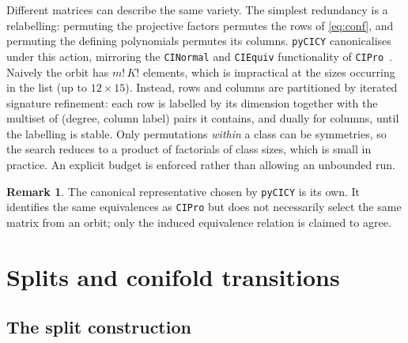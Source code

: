 \documentclass[11pt,a4paper]{article}
\theoremstyle{definition}
\newtheorem{remark}{Remark}
\begin{document}
Different matrices can describe the same variety. The simplest redundancy is
a relabelling: permuting the projective factors permutes the rows of
\cref{eq:conf}, and permuting the defining polynomials permutes its columns.
\texttt{pyCICY} canonicalises under this action, mirroring the
\texttt{CINormal} and \texttt{CIEquiv} functionality of
\texttt{CIPro}~\cite{Anderson2026}. Naively the orbit has $m!\,K!$ elements,
which is impractical at the sizes occurring in the list (up to $12\times 15$).
Instead, rows and columns are partitioned by iterated signature refinement:
each row is labelled by its dimension together with the multiset of
(degree, column label) pairs it contains, and dually for columns, until the
labelling is stable. Only permutations \emph{within} a class can be
symmetries, so the search reduces to a product of factorials of class sizes,
which is small in practice. An explicit budget is enforced rather than
allowing an unbounded run.

\begin{remark}
The canonical representative chosen by \texttt{pyCICY} is its own. It
identifies the same equivalences as \texttt{CIPro} but does not necessarily
select the same matrix from an orbit; only the induced equivalence relation
is claimed to agree.
\end{remark}

\section{Splits and conifold transitions}
\label{sec:transitions}

\subsection{The split construction}
\end{document}
